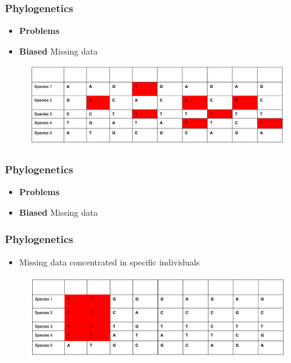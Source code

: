\documentclass{beamer}
\begin{document}
\begin{frame}
\frametitle{Phylogenetics}
\begin{itemize}
\item \textbf{Problems}
\item \textbf{Biased} Missing data
\end{itemize}
\begin{figure}
    \includegraphics[scale=0.25]{Rando.png}
    \end{figure}
\end{frame}

\begin{frame}
\frametitle{Phylogenetics}
\begin{itemize}
\item \textbf{Problems}
\item \textbf{Biased} Missing data

\end{itemize}
\end{frame}


\begin{frame}
\frametitle{Phylogenetics}
\begin{itemize}
\item Missing data concentrated in specific individuals
\end{itemize}
\begin{figure}
    \includegraphics[scale=0.25]{individualized.png}
    \end{figure}
\end{frame}
\end{document}

